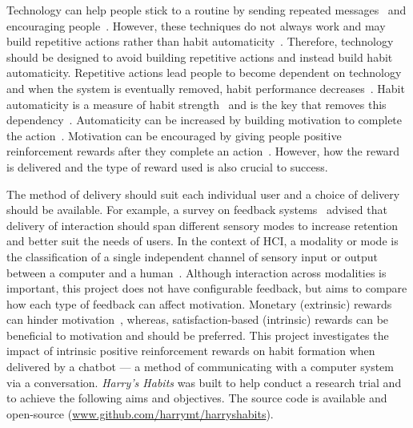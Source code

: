 Technology can help people stick to a routine by sending repeated messages~\cite{chi_crowd_designed_motivation} and encouraging people~\cite{positive_reinforcement_pro}. However, these techniques do not always work and may build repetitive actions rather than habit automaticity~\cite{coaching_not_that_good}. Therefore, technology should be designed to avoid building repetitive actions and instead build habit automaticity. Repetitive actions lead people to become dependent on technology and when the system is eventually removed, habit performance decreases~\cite{article_dont_kick_habit, article_realtime_feedback_improving_medication_taking}. Habit automaticity is a measure of habit strength~\cite{article_4q_SRBAI} and is the key that removes this dependency~\cite{article_beyond_self_tracking_designing_apps}. Automaticity can be increased by building motivation to complete the action~\cite{article_a_self_efficacy, article_meta_analytic_review_intrinsic_motivation}.
Motivation can be encouraged by giving people positive reinforcement rewards after they complete an action~\cite{positive_reinforcement_pro}. However, how the reward is delivered and the type of reward used is also crucial to success.

The method of delivery should suit each individual user and a choice of delivery should be available. For example, a survey on feedback systems~\cite{article_user_centred_multimodal_reminders} advised that delivery of interaction should span different sensory modes to increase retention and better suit the needs of users. In the context of HCI, a modality or mode is the classification of a single independent channel of sensory input or output between a computer and a human~\cite{hci_modality_definition}. Although interaction across modalities is important, this project does not have configurable feedback, but aims to compare how each type of feedback can affect motivation. Monetary (extrinsic) rewards can hinder motivation~\cite{article_meta_analytic_review_intrinsic_motivation}, whereas, satisfaction-based (intrinsic) rewards can be beneficial to motivation and should be preferred. This project investigates the impact of intrinsic positive reinforcement rewards on habit formation when delivered by a chatbot --- a method of communicating with a computer system via a conversation. \textit{Harry's Habits} was built to help conduct a research trial and to achieve the following aims and objectives. The source code is available and open-source (\url{www.github.com/harrymt/harryshabits}).

\newpage

